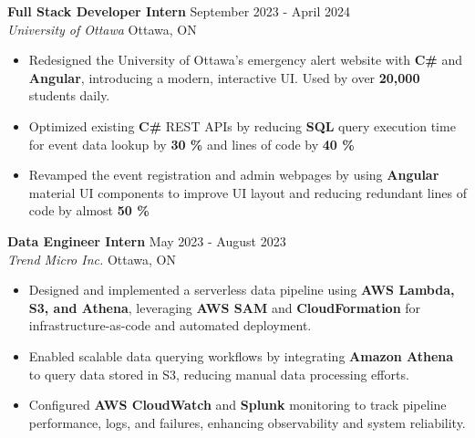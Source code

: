 \documentclass[a4paper]{article}
\begin{document}
\textbf{Full Stack Developer Intern } \hfill September 2023 - April 2024\\
\textit{University of Ottawa} \hfill Ottawa, ON\\
\vspace{-2mm}
\begin{itemize} \itemsep -4pt
    \item Redesigned the University of Ottawa's emergency alert website with \textbf{C\#} and \textbf{Angular}, introducing a modern, interactive UI. Used by over \textbf{20,000} students daily.
     \item Optimized existing \textbf{C\#} REST APIs by reducing \textbf{SQL} query execution time for event data lookup by \textbf{30 \%} and lines of code by \textbf{40 \%}
    \item Revamped the event registration and admin webpages by using \textbf{Angular} material UI components to improve UI layout and reducing redundant lines of code by almost \textbf{50 \%}
\end{itemize}


\textbf{Data Engineer Intern} \hfill May 2023 - August 2023\\
\textit{Trend Micro Inc.} \hfill Ottawa, ON\\
\vspace{-2mm}
\begin{itemize} \itemsep -4pt

\item Designed and implemented a serverless data pipeline using \textbf{AWS Lambda, S3, and Athena}, leveraging \textbf{AWS SAM} and \textbf{CloudFormation} for infrastructure-as-code and automated deployment.

\item Enabled scalable data querying workflows by integrating \textbf{Amazon Athena} to query data stored in S3, reducing manual data processing efforts.

\item Configured \textbf{AWS CloudWatch} and \textbf{Splunk} monitoring to track pipeline performance, logs, and failures, enhancing observability and system reliability.


\end{itemize}
\end{document}
